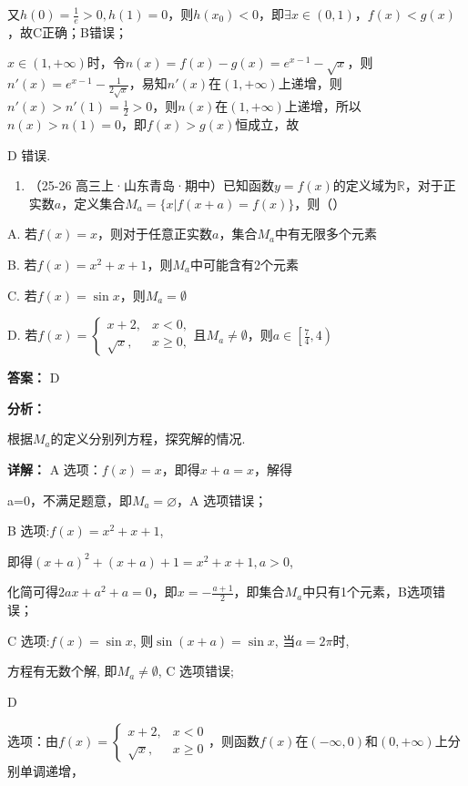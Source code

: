 \documentclass[11pt,a4paper]{ctexart}
\begin{document}
又\(h(0)=\frac{1}{e}>0,h(1)=0\)，则\(h(x_{0})<0\)，即\(\exists x\in(0,1)\)，\(f(x)<g(x)\)，故C正确；B错误；

\(x \in (1, +\infty)\)时，令\(n(x) = f(x) - g(x) = e^{x-1} - \sqrt{x}\)，则\(n'(x) = e^{x-1} - \frac{1}{2\sqrt{x}}\)，易知\(n'(x)\)在\((1, +\infty)\)上递增，则\(n'(x) > n'(1) = \frac{1}{2} > 0\)，则\(n(x)\)在\((1, +\infty)\)上递增，所以\(n(x) > n(1) = 0\)，即\(f(x) > g(x)\)恒成立，故

D 错误.

\begin{enumerate}[label=\arabic*., leftmargin=*, start=20]
\item （25-26
  高三上·山东青岛·期中）已知函数\(y = f(x)\)的定义域为\(\mathbb{R}\)，对于正实数\(a\)，定义集合\(M_a = \{x | f(x + a) = f(x)\}\)，则（）
\end{enumerate}

A. 若\(f(x) = x\)，则对于任意正实数\(a\)，集合\(M_a\)中有无限多个元素

B. 若\(f(x) = x^{2} + x + 1\)，则\(M_{a}\)中可能含有2个元素

C. 若\(f(x) = \sin x\)，则\(M_{a} = \emptyset\)

D.
若\(f(x)=\begin{cases}x+2,&x<0,\\\sqrt{x},&x\geq0,\end{cases}\)且\(M_a\neq\emptyset\)，则\(a\in\left[\frac74,4\right)\)

\textbf{答案：}
D

\textbf{分析：}

根据\(M_{a}\)的定义分别列方程，探究解的情况.

\textbf{详解：}
A 选项：\(f(x)=x\)，即得\(x+a=x\)，解得

a=0，不满足题意，即\(M_{a}=\varnothing\)，A 选项错误；

B 选项:\(f(x) = x^{2} + x + 1\),

即得\((x + a)^{2} + (x + a) + 1 = x^{2} + x + 1, a > 0\),

化简可得\(2ax + a^{2} + a = 0\)，即\(x = -\frac{a + 1}{2}\)，即集合\(M_{a}\)中只有1个元素，B选项错误；

C 选项:\(f(x) = \sin x\), 则\(\sin (x + a) = \sin x\), 当\(a = 2\pi\)时,

方程有无数个解, 即\(M_a \neq \emptyset\), C 选项错误;

D

选项：由\(f(x) = \begin{cases} x + 2, & x < 0 \\ \sqrt{x}, & x \geq 0 \end{cases}\)，则函数\(f(x)\)在\((- \infty, 0)\)和\((0, +\infty)\)上分别单调递增，
\end{document}
